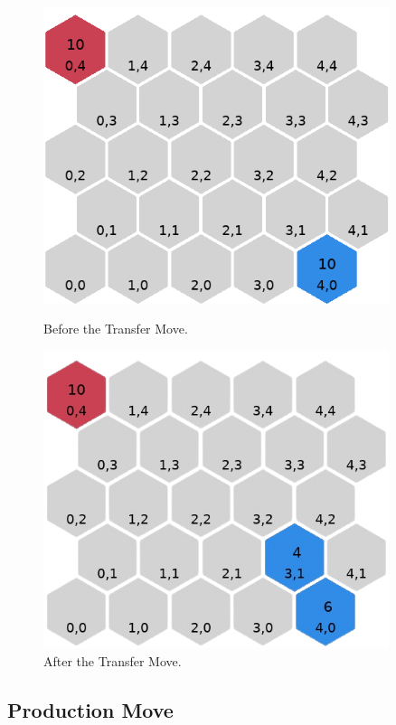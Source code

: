 \documentclass[letterpaper, 12pt]{article}
\begin{document}
\begin{figure}[H]
  \begin{minipage}[c]{.5\textwidth}
    \centering
    \includegraphics[width=0.9\textwidth]{transfer_example_1.png}
    \caption{Before the Transfer Move.}
  \end{minipage}%
  \begin{minipage}[c]{.5\textwidth} \centering
    \includegraphics[width=0.9\textwidth]{transfer_example_2.png}
    \caption{After the Transfer Move.}
  \end{minipage}
\end{figure}

\subsection*{Production Move}
\end{document}
